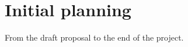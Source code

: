 \section{Initial planning}

From the draft proposal to the end of the project.


\newcommand{\Plen}{22} %

\newcommand{\Duno}{21}
\newcommand{\Ddos}{7}
\newcommand{\Dtres}{28}
\newcommand{\Dcuatro}{7}
\newcommand{\Dcinco}{21}
\newcommand{\Dseis}{7}
\newcommand{\Dsiete}{21}
\newcommand{\Docho}{14}
\newcommand{\Dnueve}{14}
\newcommand{\Ddiez}{14}

\newcommand{\Funo}{\the\numexpr \Duno /7 \relax}
\newcommand{\Fdos}{\the\numexpr \Funo + \Ddos/7 \relax}
\newcommand{\Ftres}{\the\numexpr \Fdos + \Dtres/7 \relax}
\newcommand{\Fcuatro}{\the\numexpr \Ftres + \Dcuatro/7 \relax}
\newcommand{\Fcinco}{\the\numexpr \Fcuatro + \Dcinco/7 \relax}
\newcommand{\Fseis}{\the\numexpr \Fcinco + \Dseis/7 \relax}
\newcommand{\Fsiete}{\the\numexpr \Fseis + \Dsiete/7 \relax}
\newcommand{\Focho}{\the\numexpr \Fsiete + \Docho/7 \relax}
\newcommand{\Fnueve}{\the\numexpr \Focho + \Dnueve/7 \relax}
\newcommand{\Fdiez}{\the\numexpr \Fnueve + \Ddiez/7 \relax}

\newcommand{\Frequirement}{2}



